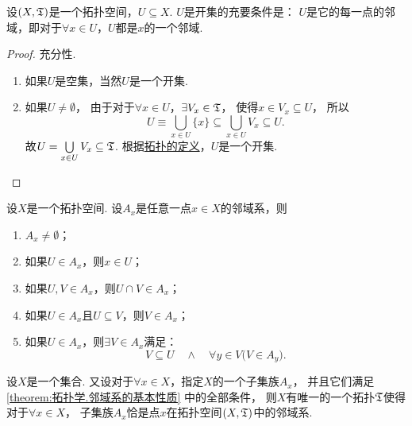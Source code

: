 \begin{theorem}\label{theorem:拓扑学.成为开集的充要条件1}
设\((X,\mathfrak T)\)是一个拓扑空间，\(U \subseteq X\).
\(U\)是开集的充要条件是：
\(U\)是它的每一点的邻域，即对于\(\forall x \in U\)，\(U\)都是\(x\)的一个邻域.
\begin{proof}
充分性.
\begin{enumerate}
	\item 如果\(U\)是空集，当然\(U\)是一个开集.

	\item 如果\(U\neq\emptyset\)，
	由于对于\(\forall x \in U\)，\(\exists V_x \in \mathfrak T\)，
	使得\(x \in V_x \subseteq U\)，
	所以\[
	U \equiv \bigcup\limits_{x \in U} \{ x \}
	\subseteq \bigcup\limits_{x \in U} V_x
	\subseteq U.
	\]
	故\(U = \bigcup\limits_{x \in U} V_x \subseteq \mathfrak T\).
	根据\hyperref[definition:拓扑学.开集公理定义的拓扑空间]{拓扑的定义}，\(U\)是一个开集.
	\qedhere
\end{enumerate}
\end{proof}
\end{theorem}

\begin{theorem}\label{theorem:拓扑学.邻域系的基本性质}
设\(X\)是一个拓扑空间.
设\(A_x\)是任意一点\(x \in X\)的邻域系，则
\begin{enumerate}
	\item \(A_x \neq \emptyset\)；
	\item 如果\(U \in A_x\)，则\(x \in U\)；
	\item 如果\(U,V \in A_x\)，则\(U \cap V \in A_x\)；
	\item 如果\(U \in A_x\)且\(U \subseteq V\)，则\(V \in A_x\)；
	\item 如果\(U \in A_x\)，则\(\exists V \in A_x\)满足：\[
		V \subseteq U
		\quad\land\quad
		\forall y \in V \bigl( V \in A_y \bigr).
	\]
\end{enumerate}
\end{theorem}

\begin{theorem}\label{theorem:拓扑学.从邻域系出发定义拓扑}
设\(X\)是一个集合.
又设对于\(\forall x \in X\)，指定\(X\)的一个子集族\(A_x\)，
并且它们满足\cref{theorem:拓扑学.邻域系的基本性质} 中的全部条件，
则\(X\)有唯一的一个拓扑\(\mathfrak T\)使得对于\(\forall x \in X\)，
子集族\(A_x\)恰是点\(x\)在拓扑空间\((X,\mathfrak T)\)中的邻域系.
\end{theorem}

